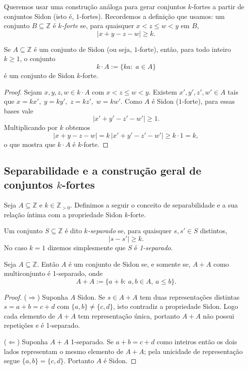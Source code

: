 \documentclass[reqno,a4paper,12pt]{amsart}
\begin{document}
Queremos usar uma construção análoga para gerar conjuntos $k$-fortes a partir de conjuntos Sidon (isto é, $1$-fortes). Recordemos a definição que usamos: um conjunto $B\subseteq\mathbb{Z}$ é \emph{$k$-forte} se, para quaisquer $x<z\le w<y$ em $B$,
\[
  |x+y-z-w|\ge k.
\]

\begin{proposition}
  \label{propk}
  Se $A\subseteq\mathbb{Z}$ é um conjunto de Sidon (ou seja, $1$-forte), então, para todo inteiro $k\ge1$, o conjunto
  \[
    k\cdot A:=\{k a:\; a\in A\}
  \]
  é um conjunto de Sidon $k$-forte.
\end{proposition}

\begin{proof}
  Sejam $x,y,z,w\in k\cdot A$ com $x<z\le w<y$. Existem $x',y',z',w'\in A$ tais que $x=kx',\;y=ky',\;z=kz',\;w=kw'$. Como $A$ é Sidon ($1$-forte), para essas bases vale
  \[
    |x'+y'-z'-w'|\ge 1.
  \]
  Multiplicando por $k$ obtemos
  \[
    |x+y-z-w|=k\,|x'+y'-z'-w'|\ge k\cdot 1 = k,
  \]
  o que mostra que $k\cdot A$ é $k$-forte.
\end{proof}

\subsection{Separabilidade e a construção geral de conjuntos $k$-fortes}

Seja $A \subseteq \mathbb{Z}$ e $k \in \mathbb{Z}_{>0}$. Definimos a seguir o conceito de separabilidade e a sua relação íntima com a propriedade Sidon $k$-forte.

\begin{definition}[$k$-separado]
  Um conjunto \(S\subseteq\mathbb Z\) é dito \emph{\(k\)-separado} se, para quaisquer
  \(s,s'\in S\) distintos,
  \[
    |s-s'|\ge k.
  \]
  No caso \(k=1\) dizemos simplesmente que \(S\) é \emph{1-separado}.
\end{definition}

\begin{proposition}\label{prop:sidon-iff-1sep}
  Seja \(A\subseteq\mathbb Z\). Então \(A\) é um conjunto de Sidon se, e somente se, \(A+A\) como multiconjunto é 1-separado,
  onde
  \[
    A+A:=\{a+b:\ a,b\in A,\ a\le b\}.
  \]
\end{proposition}

\begin{proof}
  (\(\Rightarrow\)) Suponha \(A\) Sidon. Se \(s\in A+A\) tem duas representações distintas \(s=a+b=c+d\)
  com \(\{a,b\}\neq\{c,d\}\), isto contradiz a propriedade Sidon. Logo cada elemento de \(A+A\)
  tem representação única, portanto \(A+A\) não possui repetições e é 1-separado.

  (\(\Leftarrow\)) Suponha \(A+A\) 1-separado. Se \(a+b=c+d\) como inteiros então os dois lados
  representam o mesmo elemento de \(A+A\); pela unicidade de representação segue \(\{a,b\}=\{c,d\}\).
  Portanto \(A\) é Sidon.
\end{proof}
\end{document}
